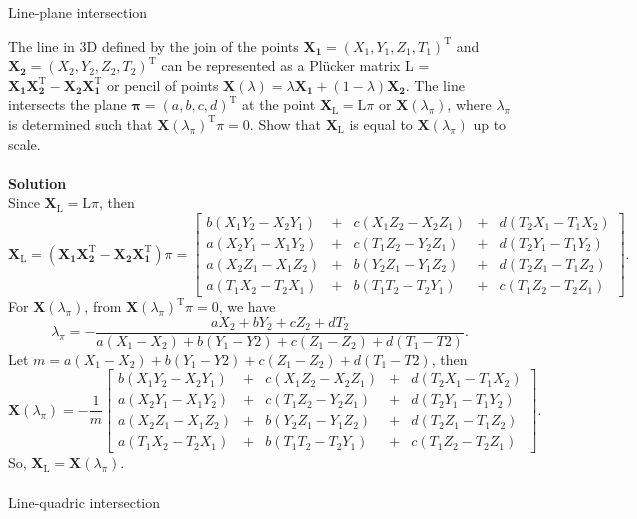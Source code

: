 \documentclass{assignment}
\date{\today}
\begin{document}
\begin{problemlist}

\pbitem Line-plane intersection

The line in 3D defined by the join of the points $\mathbf{X_1} = (X_1,Y_1,Z_1,T_1)^ \mathrm{T}$ and $\mathbf{X_2} = (X_2,Y_2,Z_2,T_2)^ \mathrm{T}$ can be represented as a Pl\"ucker matrix L = $\mathbf{X_1X_2^ \mathrm{T} - X_2X_1^ \mathrm{T}}$ or pencil of points $\mathbf{X}(\lambda) = \lambda\mathbf{X_1} + (1 - \lambda)\mathbf{X_2}$. The line intersects the plane $\mathbf{\pi} = (a,b,c,d)^\mathrm{T}$ at the point $\mathbf{X_\mathrm{L}} = \mathrm{L}\pi$ or $\mathbf{X}(\lambda_\pi)$, where $\lambda_\pi$ is determined such that $\mathbf{X}(\lambda_\pi)^\mathrm{T}\pi = 0$. Show that $\mathbf{X}_\mathrm{L}$ is equal to $\mathbf{X}(\lambda_\pi)$ up to scale.
\\
\\
\textbf{Solution}\\
Since $\mathbf{X_\mathrm{L}} = \mathrm{L}\pi$, then
\[ \mathbf{X_\mathrm{L}} = (\mathbf{X_1X_2^ \mathrm{T} - X_2X_1^ \mathrm{T}})\pi =
\begin{bmatrix}
b(X_1Y_2-X_2Y_1)&+&c(X_1Z_2 - X_2Z_1)&+&d(T_2X_1 - T_1X_2)\\
a(X_2Y_1-X_1Y_2)&+&c(T_1Z_2 - Y_2Z_1)&+&d(T_2Y_1 - T_1Y_2)\\
a(X_2Z_1-X_1Z_2)&+&b(Y_2Z_1 - Y_1Z_2)&+&d(T_2Z_1 - T_1Z_2)\\
a(T_1X_2-T_2X_1)&+&b(T_1T_2 - T_2Y_1)&+&c(T_1Z_2 - T_2Z_1)\end{bmatrix}.\]
For $\mathbf{X}(\lambda_\pi)$, from $\mathbf{X}(\lambda_\pi)^\mathrm{T}\pi = 0$, we have
\[ \lambda_\pi = -\frac{aX_2+bY_2+cZ_2+dT_2}{a(X_1-X_2)+b(Y_1-Y2)+c(Z_1-Z_2)+d(T_1-T2)}.\]Let $m = a(X_1-X_2)+b(Y_1-Y2)+c(Z_1-Z_2)+d(T_1-T2)$, then
\[\mathbf{X}(\lambda_\pi) = -\frac{1}{m}
\begin{bmatrix}
b(X_1Y_2-X_2Y_1)&+&c(X_1Z_2 - X_2Z_1)&+&d(T_2X_1 - T_1X_2)\\
a(X_2Y_1-X_1Y_2)&+&c(T_1Z_2 - Y_2Z_1)&+&d(T_2Y_1 - T_1Y_2)\\
a(X_2Z_1-X_1Z_2)&+&b(Y_2Z_1 - Y_1Z_2)&+&d(T_2Z_1 - T_1Z_2)\\
a(T_1X_2-T_2X_1)&+&b(T_1T_2 - T_2Y_1)&+&c(T_1Z_2 - T_2Z_1)\end{bmatrix}.
\]
So, $\mathbf{X}_\mathrm{L} = \mathbf{X}(\lambda_\pi)$.
\\\\
\pbitem Line-quadric intersection


\end{problemlist}
\end{document}
